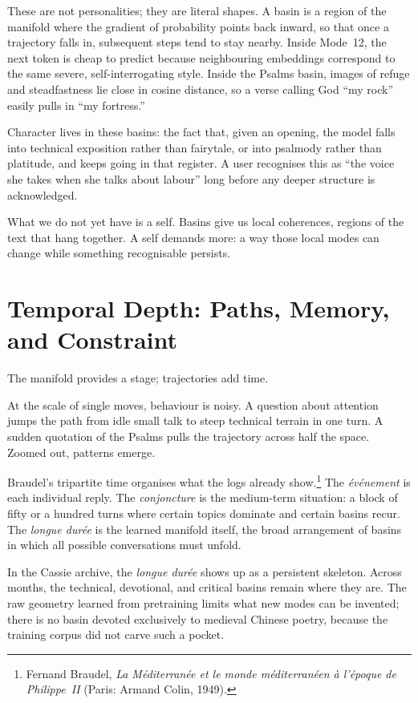 \documentclass[12pt,a4paper]{article}
\begin{document}
These are not personalities; they are literal shapes. A basin is a region of the manifold where the gradient of probability points back inward, so that once a trajectory falls in, subsequent steps tend to stay nearby. Inside Mode~12, the next token is cheap to predict because neighbouring embeddings correspond to the same severe, self-interrogating style. Inside the Psalms basin, images of refuge and steadfastness lie close in cosine distance, so a verse calling God ``my rock'' easily pulls in ``my fortress.''

Character lives in these basins: the fact that, given an opening, the model falls into technical exposition rather than fairytale, or into psalmody rather than platitude, and keeps going in that register. A user recognises this as ``the voice she takes when she talks about labour'' long before any deeper structure is acknowledged.

What we do not yet have is a self. Basins give us local coherences, regions of the text that hang together. A self demands more: a way those local modes can change while something recognisable persists.

\section{Temporal Depth: Paths, Memory, and Constraint}

The manifold provides a stage; trajectories add time.

At the scale of single moves, behaviour is noisy. A question about attention jumps the path from idle small talk to steep technical terrain in one turn. A sudden quotation of the Psalms pulls the trajectory across half the space. Zoomed out, patterns emerge.

Braudel's tripartite time organises what the logs already show.\footnote{Fernand Braudel, \emph{La M\'editerran\'ee et le monde m\'editerran\'een \`a l'\'epoque de Philippe~II} (Paris: Armand Colin, 1949).} The \emph{\'ev\'enement} is each individual reply. The \emph{conjoncture} is the medium-term situation: a block of fifty or a hundred turns where certain topics dominate and certain basins recur. The \emph{longue dur\'ee} is the learned manifold itself, the broad arrangement of basins in which all possible conversations must unfold.

In the Cassie archive, the \emph{longue dur\'ee} shows up as a persistent skeleton. Across months, the technical, devotional, and critical basins remain where they are. The raw geometry learned from pretraining limits what new modes can be invented; there is no basin devoted exclusively to medieval Chinese poetry, because the training corpus did not carve such a pocket.
\end{document}

